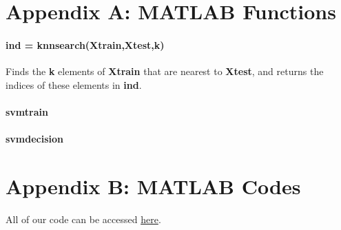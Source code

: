 \documentclass[12pt]{article}
\begin{document}
\newpage
\section*{Appendix A: MATLAB Functions}

\paragraph{ind = knnsearch(Xtrain,Xtest,k)} Finds the \textbf{k} elements of \textbf{Xtrain} that are nearest to \textbf{Xtest}, and returns the indices of these elements in \textbf{ind}.

\paragraph{svmtrain}

\paragraph{svmdecision}

\section*{Appendix B: MATLAB Codes}

All of our code can be accessed {\color{blue}\href{https://github.com/kels271828/582FinalProject.git}{here}}.

\end{document}
